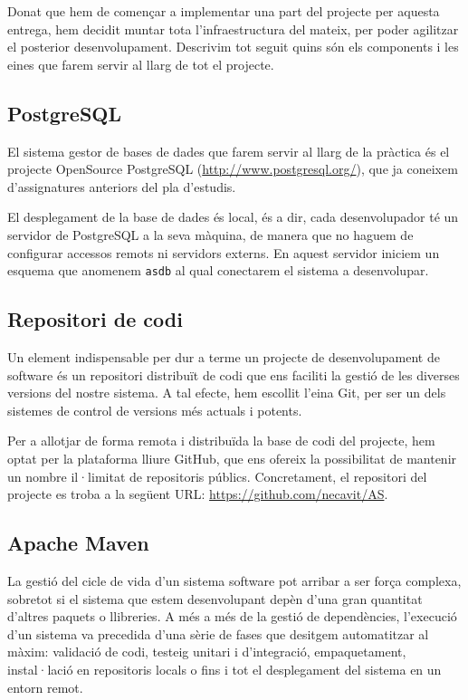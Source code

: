Donat que hem de començar a implementar una part del projecte per aquesta entrega, hem decidit muntar tota l'infraestructura del mateix, per poder agilitzar el posterior desenvolupament. Descrivim tot seguit quins són els components i les eines que farem servir al llarg de tot el projecte.

\subsection{PostgreSQL}
El sistema gestor de bases de dades que farem servir al llarg de la pràctica és el projecte OpenSource PostgreSQL (\url{http://www.postgresql.org/}), que ja coneixem d'assignatures anteriors del pla d'estudis.

El desplegament de la base de dades és local, és a dir, cada desenvolupador té un servidor de PostgreSQL a la seva màquina, de manera que no haguem de configurar accessos remots ni servidors externs. En aquest servidor iniciem un esquema que anomenem \texttt{asdb} al qual conectarem el sistema a desenvolupar.

\subsection{Repositori de codi}
Un element indispensable per dur a terme un projecte de desenvolupament de software és un repositori distribuït de codi que ens faciliti la gestió de les diverses versions del nostre sistema. A tal efecte, hem escollit l'eina Git, per ser un dels sistemes de control de versions més actuals i potents.

Per a allotjar de forma remota i distribuïda la base de codi del projecte, hem optat per la plataforma lliure GitHub, que ens ofereix la possibilitat de mantenir un nombre il·limitat de repositoris públics. Concretament, el repositori del projecte es troba a la següent URL: \url{https://github.com/necavit/AS}.

\subsection{Apache Maven}
La gestió del cicle de vida d'un sistema software pot arribar a ser força complexa, sobretot si el sistema que estem desenvolupant depèn d'una gran quantitat d'altres paquets o llibreries. A més a més de la gestió de dependències, l'execució d'un sistema va precedida d'una sèrie de fases que desitgem automatitzar al màxim: validació de codi, testeig unitari i d'integració, empaquetament, instal·lació en repositoris locals o fins i tot el desplegament del sistema en un entorn remot.


